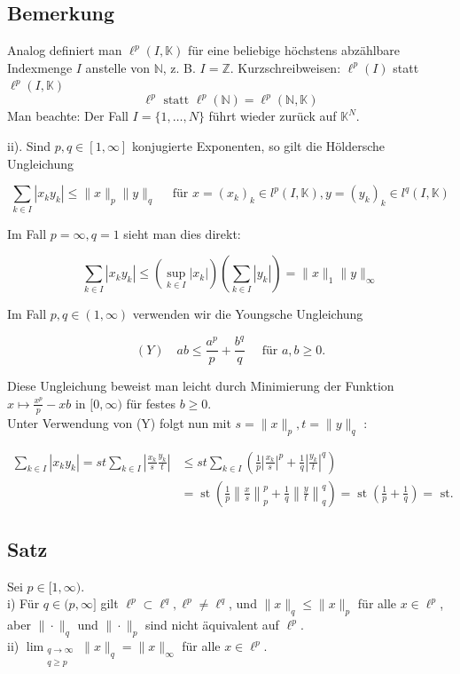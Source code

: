 \documentclass[10pt, letterpaper]{article}
\begin{document}
\subsection*{Bemerkung}


Analog definiert man $\ell^{p}(I, \mathbb{K})$ für eine beliebige höchstens abzählbare Indexmenge $I$ anstelle von $\mathbb{N}$, z. B. $I=\mathbb{Z}$. Kurzschreibweisen: $\ell^{p}(I)$ statt $\ell^{p}(I, \mathbb{K})$
$$
\ell^{p} \text { statt } \ell^{p}(\mathbb{N})=\ell^{p}(\mathbb{N}, \mathbb{K})
$$
Man beachte: Der Fall $I=\{1, \ldots, N\}$ führt wieder zurück auf $\mathbb{K}^{N}$.


ii). Sind $p, q \in[1, \infty]$ konjugierte Exponenten, so gilt die Höldersche Ungleichung

$$
\sum_{k \in I}\left|x_{k} y_{k}\right| \leq\|x\|_{p}\|y\|_{q} \quad \text { für } x=\left(x_{k}\right)_{k} \in l^{p}(I, \mathbb{K}), y=\left(y_{k}\right)_{k} \in l^{q}(I, \mathbb{K})
$$

Im Fall $p=\infty, q=1$ sieht man dies direkt:

$$
\sum_{k \in I}\left|x_{k} y_{k}\right| \leq\left(\sup _{k \in I}\left|x_{k}\right|\right)\left(\sum_{k \in I}\left|y_{k}\right|\right)=\|x\|_{1}\|y\|_{\infty}
$$

Im Fall $p, q \in(1, \infty)$ verwenden wir die Youngsche Ungleichung

$$
(Y) \quad a b \leq \frac{a^{p}}{p}+\frac{b^{q}}{q} \quad \text { für } a, b \geq 0 .
$$

Diese Ungleichung beweist man leicht durch Minimierung der Funktion $x \mapsto \frac{x^{p}}{p}-x b$ in $[0, \infty)$ für festes $b \geq 0$.\\
Unter Verwendung von (Y) folgt nun mit $s=\|x\|_{p}, t=\|y\|_{q}$ :

$$
\begin{aligned}
\sum_{k \in I}\left|x_{k} y_{k}\right|=s t \sum_{k \in I}\left|\frac{x_{k}}{s} \frac{y_{k}}{t}\right| & \leq s t \sum_{k \in I}\left(\frac{1}{p}\left|\frac{x_{k}}{s}\right|^{p}+\frac{1}{q}\left|\frac{y_{k}}{t}\right|^{q}\right) \\
& =\operatorname{st}\left(\frac{1}{p}\left\|\frac{x}{s}\right\|_{p}^{p}+\frac{1}{q}\left\|\frac{y}{t}\right\|_{q}^{q}\right)=\operatorname{st}\left(\frac{1}{p}+\frac{1}{q}\right)=\text { st. }
\end{aligned}
$$

\subsection*{Satz}
Sei $p \in[1, \infty)$.\\
i) Für $q \in(p, \infty]$ gilt $\ell^{p} \subset \ell^{q}, \ell^{p} \neq \ell^{q}$, und $\|x\|_{q} \leq\|x\|_{p}$ für alle $x \in \ell^{p}$, aber $\|\cdot\|_{q}$ und $\|\cdot\|_{p}$ sind nicht äquivalent auf $\ell^{p}$.\\
ii) $\lim _{\substack{q \rightarrow \infty \\ q \geq p}}\|x\|_{q}=\|x\|_{\infty}$ für alle $x \in \ell^{p}$.
\end{document}
